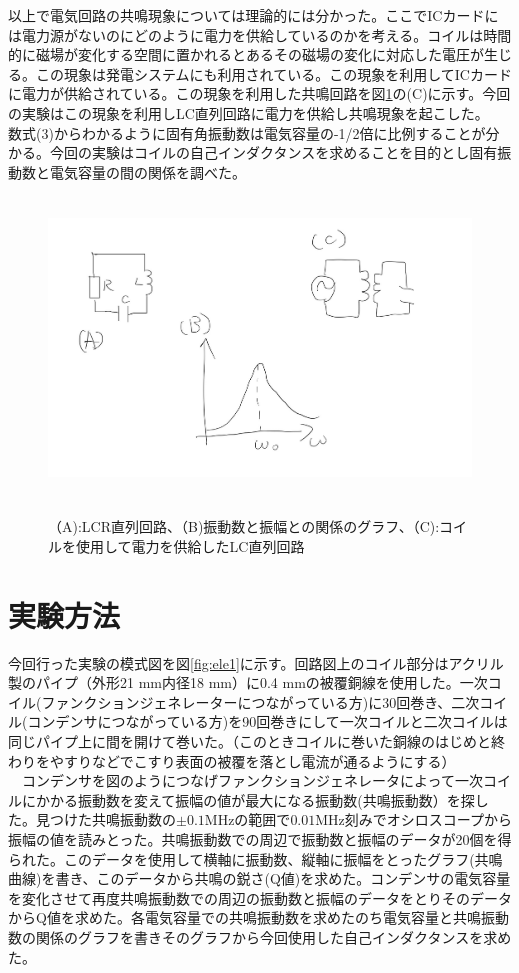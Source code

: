 以上で電気回路の共鳴現象については理論的には分かった。ここでICカードには電力源がないのにどのように電力を供給しているのかを考える。コイルは時間的に磁場が変化する空間に置かれるとあるその磁場の変化に対応した電圧が生じる。この現象は発電システムにも利用されている。この現象を利用してICカードに電力が供給されている。この現象を利用した共鳴回路を図\ref{fig:ele}の(C)に示す。今回の実験はこの現象を利用しLC直列回路に電力を供給し共鳴現象を起こした。\\
数式(3)からわかるように固有角振動数は電気容量の-1/2倍に比例することが分かる。今回の実験はコイルの自己インダクタンスを求めることを目的とし固有振動数と電気容量の間の関係を調べた。
\\
\begin{figure}[H]
\centering
\includegraphics[height=8cm,clip]{kadono/image/houhou.jpg}
\label{fig:ele}
\caption{（A):LCR直列回路、（B)振動数と振幅との関係のグラフ、（C):コイルを使用して電力を供給したLC直列回路}
\end{figure}
\newpage
 \section{実験方法}
今回行った実験の模式図を図\ref{fig:ele1}に示す。回路図上のコイル部分はアクリル製のパイプ（外形21 mm内径18 mm）に0.4 mmの被覆銅線を使用した。一次コイル(ファンクションジェネレーターにつながっている方)に30回巻き、二次コイル(コンデンサにつながっている方)を90回巻きにして一次コイルと二次コイルは同じパイプ上に間を開けて巻いた。（このときコイルに巻いた銅線のはじめと終わりをやすりなどでこすり表面の被覆を落とし電流が通るようにする）\\
　コンデンサを図のようにつなげファンクションジェネレータによって一次コイルにかかる振動数を変えて振幅の値が最大になる振動数(共鳴振動数）を探した。見つけた共鳴振動数の$\pm 0.1$MHzの範囲で$0.01$MHz刻みでオシロスコープから振幅の値を読みとった。共鳴振動数での周辺で振動数と振幅のデータが20個を得られた。このデータを使用して横軸に振動数、縦軸に振幅をとったグラフ(共鳴曲線)を書き、このデータから共鳴の鋭さ(Q値)を求めた。コンデンサの電気容量を変化させて再度共鳴振動数での周辺の振動数と振幅のデータをとりそのデータからQ値を求めた。各電気容量での共鳴振動数を求めたのち電気容量と共鳴振動数の関係のグラフを書きそのグラフから今回使用した自己インダクタンスを求めた。


